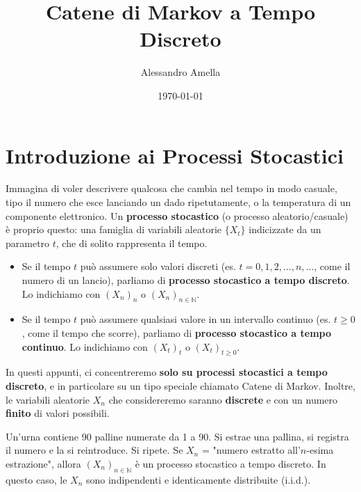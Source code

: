 

\title{Catene di Markov a Tempo Discreto}
\author{Alessandro Amella}
\date{\today}


\maketitle
\tableofcontents

\usetikzlibrary{arrows}

\newpage

\section{Introduzione ai Processi Stocastici}
Immagina di voler descrivere qualcosa che cambia nel tempo in modo casuale, tipo il numero che esce lanciando un dado ripetutamente, o la temperatura di un componente elettronico.
Un \textbf{processo stocastico} (o processo aleatorio/casuale) è proprio questo: una famiglia di variabili aleatorie $\{X_t\}$ indicizzate da un parametro $t$, che di solito rappresenta il tempo.

\begin{itemize}
    \item Se il tempo $t$ può assumere solo valori discreti (es. $t=0, 1, 2, \dots, n, \dots$, come il numero di un lancio), parliamo di \textbf{processo stocastico a tempo discreto}. Lo indichiamo con $(X_n)_n$ o $(X_n)_{n \in \mathbb{N}}$.
    \item Se il tempo $t$ può assumere qualsiasi valore in un intervallo continuo (es. $t \ge 0$, come il tempo che scorre), parliamo di \textbf{processo stocastico a tempo continuo}. Lo indichiamo con $(X_t)_t$ o $(X_t)_{t \ge 0}$.
\end{itemize}
In questi appunti, ci concentreremo \textbf{solo su processi stocastici a tempo discreto}, e in particolare su un tipo speciale chiamato Catene di Markov. Inoltre, le variabili aleatorie $X_n$ che considereremo saranno \textbf{discrete} e con un numero \textbf{finito} di valori possibili.

\begin{example}
Un'urna contiene 90 palline numerate da 1 a 90. Si estrae una pallina, si registra il numero e la si reintroduce. Si ripete.
Se $X_n$ = "numero estratto all'$n$-esima estrazione", allora $(X_n)_{n \in \mathbb{N}}$ è un processo stocastico a tempo discreto. In questo caso, le $X_n$ sono indipendenti e identicamente distribuite (i.i.d.).
\end{example}

